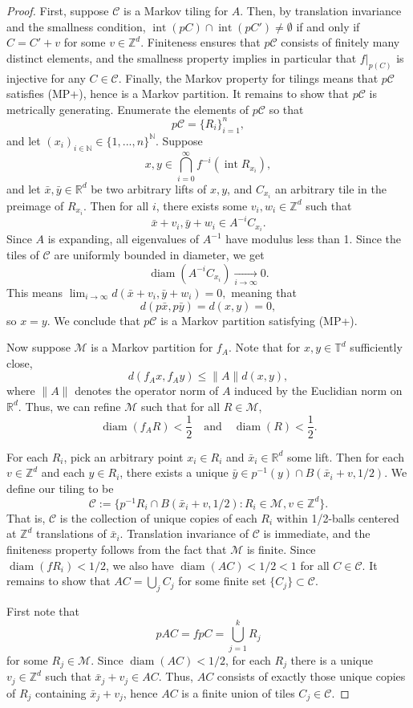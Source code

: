\documentclass{article}
\def\N{\mathbb{N}}
\def\R{\mathbb{R}}
\def\Z{\mathbb{Z}}
\def\T{\mathbb{T}}
\def\M{\mathcal{M}}
\def\diam{\operatorname{diam}}
\begin{document}
\begin{proof}
    First, suppose $\mathcal{C}$ is a Markov tiling for $A$. Then, by translation invariance and the smallness condition, $\operatorname{int}(pC)\cap \operatorname{int}(pC') \neq \emptyset$ if and only if $C=C'+v$ for some $v\in \Z^d$. Finiteness ensures that $p\mathcal{C}$ consists of finitely many distinct elements, and the smallness property implies in particular that $f|_{p(C)}$ is injective for any $C\in \mathcal{C}$. Finally, the Markov property for tilings means that $p\mathcal{C}$ satisfies (MP+), hence is a Markov partition. It remains to show that $p\mathcal{C}$ is metrically generating. Enumerate the elements of $p\mathcal{C}$ so that $$p\mathcal{C}=\{R_i\}_{i=1}^n,$$ and let $(x_i)_{i\in \N}\in \{1,...,n\}^{\N}$. Suppose $$x,y\in \bigcap_{i=0}^\infty f^{-i}(\operatorname{int}R_{x_i}),$$ and let $\bar{x},\bar{y}\in \R^d$ be two arbitrary lifts of $x,y$, and $C_{x_i}$ an arbitrary tile in the preimage of $R_{x_i}$. Then for all $i$, there exists some $v_i,w_i\in \Z^d$ such that $$\bar{x}+v_i,\bar{y}+w_i\in A^{-i}C_{x_i}.$$ Since $A$ is expanding, all eigenvalues of $A^{-1}$ have modulus less than 1. Since the tiles of $\mathcal{C}$ are uniformly bounded in diameter, we get $$\operatorname{diam}(A^{-i}C_{x_i})\xrightarrow[i\to \infty]{} 0.$$ This means $\lim_{i\to\infty} d(\bar{x}+v_i,\bar{y}+w_i)= 0,$ meaning that $$d(p\bar{x},p\bar{y})=d(x,y)=0,$$ so $x=y$. We conclude that $p\mathcal{C}$ is a Markov partition satisfying (MP+).

    Now suppose $\mathcal{M}$ is a Markov partition for $f_A$. Note that for $x,y\in\T^d$ sufficiently close, $$ d(f_Ax,f_Ay) \leq \|A\| d(x,y),$$ where $\|A\|$ denotes the operator norm of $A$ induced by the Euclidian norm on $\R^d$. Thus, we can refine $\M$ such that for all $R\in\mathcal{M}$, $$\diam(f_AR)<\frac{1}{2}\quad \text{and} \quad \diam(R)<\frac{1}{2}.$$

    For each $R_i$, pick an arbitrary point $x_i\in R_i$ and $\bar{x}_i\in \R^d$ some lift. Then for each $v\in \Z^d$ and each $y\in R_i$, there exists a unique $\bar{y}\in p^{-1}(y)\cap B(\bar{x}_i+v,1/2).$ We define our tiling to be $$\mathcal{C}:=\{p^{-1}R_i\cap B(\bar{x}_i+v,1/2):R_i\in\M,v\in\Z^d\}.$$
    That is, $\mathcal{C}$ is the collection of unique copies of each $R_i$ within 1/2-balls centered at $\Z^d$ translations of $\bar{x}_i$.
    Translation invariance of $\mathcal{C}$ is immediate, and the finiteness property follows from the fact that $\mathcal{M}$ is finite. Since $\diam(fR_i)<1/2$, we also have $\diam(AC)<1/2<1$ for all $C\in \mathcal{C}$. It remains to show that $AC=\bigcup_jC_j$ for some finite set $\{C_j\}\subset\mathcal{C}$. 

    First note that $$pAC=fpC=\bigcup_{j=1}^kR_j$$ for some $R_j\in \M$. Since $\diam(AC)<1/2$, for each $R_j$ there is a unique $v_j\in\Z^d$ such that $\bar{x}_j+v_j\in AC$. Thus, $AC$ consists of exactly those unique copies of $R_j$ containing $\bar{x}_j+v_j$, hence $AC$ is a finite union of tiles $C_j\in \mathcal{C}$. 
\end{proof}
\end{document}
